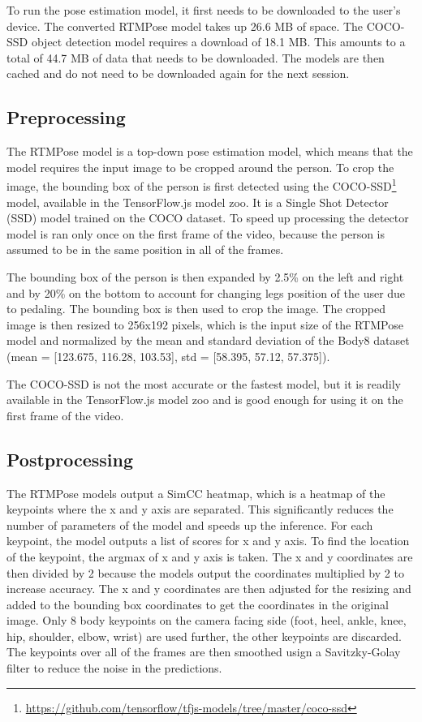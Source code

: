 To run the pose estimation model, it first needs to be downloaded to the user's device. The converted RTMPose model takes up 26.6 MB of space. The COCO-SSD object detection model requires a download of 18.1 MB. This amounts to a total of 44.7 MB of data that needs to be downloaded. The models are then cached and do not need to be downloaded again for the next session.
\subsection{Preprocessing}
The RTMPose model is a top-down pose estimation model, which means that the model requires the input image to be cropped around the person. To crop the image, the bounding box of the person is first detected using the COCO-SSD\footnote{\url{https://github.com/tensorflow/tfjs-models/tree/master/coco-ssd}} model, available in the TensorFlow.js model zoo. It is a Single Shot Detector (SSD) \cite{ssd} model trained on the COCO \cite{coco} dataset. To speed up processing the detector model is ran only once on the first frame of the video, because the person is assumed to be in the same position in all of the frames.

The bounding box of the person is then expanded by 2.5\% on the left and right and by 20\% on the bottom to account for changing legs position of the user due to pedaling. The bounding box is then used to crop the image. The cropped image is then resized to 256x192 pixels, which is the input size of the RTMPose model and normalized by the mean and standard deviation of the Body8 dataset (mean = [123.675, 116.28, 103.53], std = [58.395, 57.12, 57.375]).

The COCO-SSD is not the most accurate or the fastest model, but it is readily available in the TensorFlow.js model zoo and is good enough for using it on the first frame of the video.

\subsection{Postprocessing}
The RTMPose models output a SimCC \cite{simcc} heatmap, which is a heatmap of the keypoints where the x and y axis are separated. This significantly reduces the number of parameters of the model and speeds up the inference. For each keypoint, the model outputs a list of scores for x and y axis. To find the location of the keypoint, the argmax of x and y axis is taken. The x and y coordinates are then divided by 2 because the models output the coordinates multiplied by 2 to increase accuracy. The x and y coordinates are then adjusted for the resizing and added to the bounding box coordinates to get the coordinates in the original image. Only 8 body keypoints on the camera facing side (foot, heel, ankle, knee, hip, shoulder, elbow, wrist) are used further, the other keypoints are discarded. The keypoints over all of the frames are then smoothed usign a Savitzky-Golay filter \cite{savgol} to reduce the noise in the predictions.


